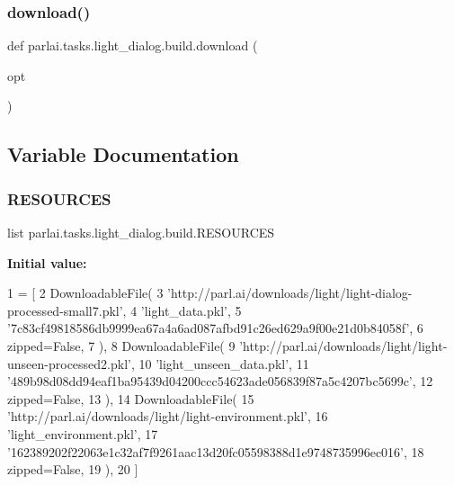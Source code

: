 \mbox{\label{namespaceparlai_1_1tasks_1_1light__dialog_1_1build_af4e1d56472312e493c43483a2dfff5a3}} 
\subsubsection{\texorpdfstring{download()}{download()}}
{\footnotesize\ttfamily def parlai.\+tasks.\+light\+\_\+dialog.\+build.\+download (\begin{DoxyParamCaption}\item[{}]{opt }\end{DoxyParamCaption})}



\subsection{Variable Documentation}
\mbox{\label{namespaceparlai_1_1tasks_1_1light__dialog_1_1build_a4153cf00ec4b1740f5f47b575291849d}} 
\subsubsection{\texorpdfstring{R\+E\+S\+O\+U\+R\+C\+ES}{RESOURCES}}
{\footnotesize\ttfamily list parlai.\+tasks.\+light\+\_\+dialog.\+build.\+R\+E\+S\+O\+U\+R\+C\+ES}

{\bfseries Initial value\+:}
\begin{DoxyCode}
1 =  [
2     DownloadableFile(
3         \textcolor{stringliteral}{'http://parl.ai/downloads/light/light-dialog-processed-small7.pkl'},
4         \textcolor{stringliteral}{'light\_data.pkl'},
5         \textcolor{stringliteral}{'7c83cf49818586db9999ea67a4a6ad087afbd91c26ed629a9f00e21d0b84058f'},
6         zipped=\textcolor{keyword}{False},
7     ),
8     DownloadableFile(
9         \textcolor{stringliteral}{'http://parl.ai/downloads/light/light-unseen-processed2.pkl'},
10         \textcolor{stringliteral}{'light\_unseen\_data.pkl'},
11         \textcolor{stringliteral}{'489b98d08dd94eaf1ba95439d04200ccc54623ade056839f87a5c4207bc5699c'},
12         zipped=\textcolor{keyword}{False},
13     ),
14     DownloadableFile(
15         \textcolor{stringliteral}{'http://parl.ai/downloads/light/light-environment.pkl'},
16         \textcolor{stringliteral}{'light\_environment.pkl'},
17         \textcolor{stringliteral}{'162389202f22063e1c32af7f9261aac13d20fc05598388d1e9748735996ec016'},
18         zipped=\textcolor{keyword}{False},
19     ),
20 ]
\end{DoxyCode}
